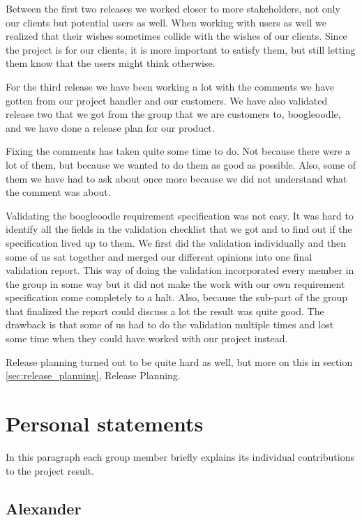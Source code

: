 \documentclass[a4paper]{article}
\begin{document}
Between the first two releases we worked closer to more stakeholders, not only our clients but potential users as well. When working with users as well we realized that their wishes sometimes collide with the wishes of our clients. Since the project is for our clients, it is more important to satisfy them, but still letting them know that the users might think otherwise.



For the third release we have been working a lot with the comments we have gotten from our project handler and our customers. We have also validated release two that we got from the group that we are customers to, boogleoodle, and we have done a release plan for our product. 

Fixing the comments has taken quite some time to do. Not because there were a lot of them, but because we wanted to do them as good as possible. Also, some of them we have had to ask about once more because we did not understand what the comment was about. 

Validating the boogleoodle requirement specification was not easy. It was hard to identify all the fields in the validation checklist that we got and to find out if the specification lived up to them. We first did the validation individually and then some of us sat together and merged our different opinions into one final validation report. This way of doing the validation incorporated every member in the group in some way but it did not make the work with our own requirement specification come completely to a halt. Also, because the sub-part of the group that finalized the report could discuss a lot the result was quite good. The drawback is that some of us had to do the validation multiple times and lost some time when they could have worked with our project instead. 

Release planning turned out to be quite hard as well, but more on this in section \ref{sec:release_planning}, Release Planning.

	\section{Personal statements}
In this paragraph each group member briefly explains its individual contributions to the project result.
	
	\subsection{Alexander}
\end{document}
